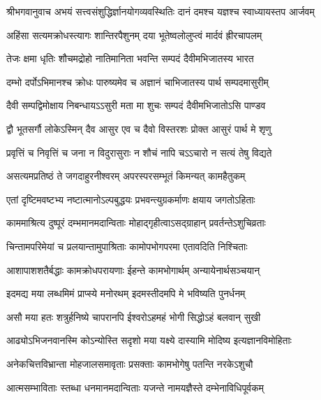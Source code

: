 {श्रीभगवानुवाच}
\twolineshloka
{अभयं सत्त्वसंशुद्धिर्ज्ञानयोगव्यवस्थितिः}
{दानं दमश्च यज्ञश्च स्वाध्यायस्तप आर्जवम्}%

\twolineshloka
{अहिंसा सत्यमक्रोधस्त्यागः शान्तिरपैशुनम्}
{दया भूतेष्वलोलुप्त्वं मार्दवं ह्रीरचापलम्}%

\twolineshloka
{तेजः क्षमा धृतिः शौचमद्रोहो नातिमानिता}
{भवन्ति सम्पदं दैवीमभिजातस्य भारत}%

\twolineshloka
{दम्भो दर्पोऽभिमानश्च क्रोधः पारुष्यमेव च}
{अज्ञानं चाभिजातस्य पार्थ सम्पदमासुरीम्}%

\twolineshloka
{दैवी सम्पद्विमोक्षाय निबन्धायऽऽसुरी मता}
{मा शुचः सम्पदं दैवीमभिजातोऽसि पाण्डव}%

\twolineshloka
{द्वौ भूतसर्गौ लोकेऽस्मिन् दैव आसुर एव च}
{दैवो विस्तरशः प्रोक्त आसुरं पार्थ मे शृणु}%

\twolineshloka
{प्रवृत्तिं च निवृत्तिं च जना न विदुरासुराः}
{न शौचं नापि चऽऽचारो न सत्यं तेषु विद्यते}%

\twolineshloka
{असत्यमप्रतिष्ठं ते जगदाहुरनीश्वरम्}
{अपरस्परसम्भूतं किमन्यत् कामहैतुकम्}%

\twolineshloka
{एतां दृष्टिमवष्टभ्य नष्टात्मानोऽल्पबुद्धयः}
{प्रभवन्त्युग्रकर्माणः क्षयाय जगतोऽहिताः}%

\twolineshloka
{काममाश्रित्य दुष्पूरं दम्भमानमदान्विताः}
{मोहाद्गृहीत्वाऽसद्ग्राहान् प्रवर्तन्तेऽशुचिव्रताः}%

\twolineshloka
{चिन्तामपरिमेयां च प्रलयान्तामुपाश्रिताः}
{कामोपभोगपरमा एतावदिति निश्चिताः}%

\twolineshloka
{आशापाशशतैर्बद्धाः कामक्रोधपरायणाः}
{ईहन्ते कामभोगार्थम् अन्यायेनार्थसञ्चयान्}%

\twolineshloka
{इदमद्य मया लब्धमिमं प्राप्स्ये मनोरथम्}
{इदमस्तीदमपि मे भविष्यति पुनर्धनम्}%

\twolineshloka
{असौ मया हतः शत्रुर्हनिष्ये चापरानपि}
{ईश्वरोऽहमहं भोगी सिद्धोऽहं बलवान् सुखी}%

\twolineshloka
{आढ्योऽभिजनवानस्मि कोऽन्योस्ति सदृशो मया}
{यक्ष्ये दास्यामि मोदिष्य इत्यज्ञानविमोहिताः}%

\twolineshloka
{अनेकचित्तविभ्रान्ता मोहजालसमावृताः}
{प्रसक्ताः कामभोगेषु पतन्ति नरकेऽशुचौ}%

\twolineshloka
{आत्मसम्भाविताः स्तब्धा धनमानमदान्विताः}
{यजन्ते नामयज्ञैस्ते दम्भेनाविधिपूर्वकम्}%

